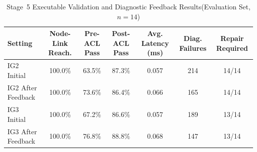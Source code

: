 \begin{table}[t]
\caption{Stage~5 Executable Validation and Diagnostic Feedback Results(Evaluation Set, $n=14$)}
\label{tab:stage5}
\centering
\small
\begin{tabular}{lcccccc}
\hline
\textbf{Setting} & \textbf{Node-Link Reach.}
                 & \textbf{Pre-ACL Pass} & \textbf{Post-ACL Pass}
                 & \textbf{Avg. Latency (ms)} & \textbf{Diag. Failures}
                 & \textbf{Repair Required} \\
\hline
IG2 Initial & 100.0\% & 63.5\% & 87.3\% & 0.057 & 214 & 14/14 \\
IG2 After Feedback & 100.0\% & 73.6\% & 86.4\% & 0.066 & 165 & 14/14 \\
IG3 Initial & 100.0\% & 67.2\% & 86.6\% & 0.057 & 189 & 13/14 \\
IG3 After Feedback & 100.0\% & 76.8\% & 88.8\% & 0.068 & 147 & 13/14 \\
\hline
\end{tabular}
\end{table}
